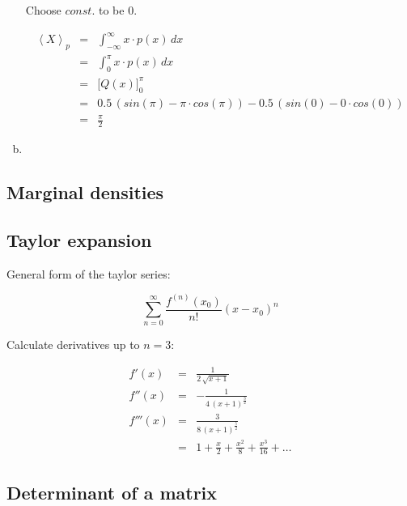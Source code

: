 \documentclass[11pt,a4paper]{article}
\begin{document}
\begin{enumerate}[a)]
Choose $const.$ to be $0$.

\begin{eqnarray*}
\left\langle X \right\rangle_p  &   = & \int_{-\infty}^\infty x \cdot p(x) \, dx\\
                                &   = & \int_0^\pi x \cdot p(x) \, dx\\
                                &   = & \Big[ Q(x) \Big]_0^\pi\\
                                &   = & 0.5 \, (sin(\pi) - \pi \cdot cos(\pi)) - 0.5 \, (sin(0) - 0 \cdot cos(0))\\
                                &   = & \frac{\pi}{2}
\end{eqnarray*}

\item

\end{enumerate}

\subsection{Marginal densities}

\subsection{Taylor expansion}

General form of the taylor series:

\begin{displaymath}
\sum_{n=0}^\infty \frac{f^{(n)}(x_0)}{n!} (x - x_0)^n
\end{displaymath}

Calculate derivatives up to $n=3$:

\begin{eqnarray*}
f'(x)   &   = & \frac{1}{2 \, \sqrt{x + 1}}\\
f''(x)  &   = & - \frac{1}{4 \, (x + 1)^\frac{3}{2}}\\
f'''(x) &   = & \frac{3}{8 \, (x + 1)^\frac{5}{2}}\\
        &   = & 1 + \frac{x}{2} + \frac{x^2}{8} + \frac{x^3}{16} + \ldots
\end{eqnarray*}

\subsection{Determinant of a matrix}
\end{document}
